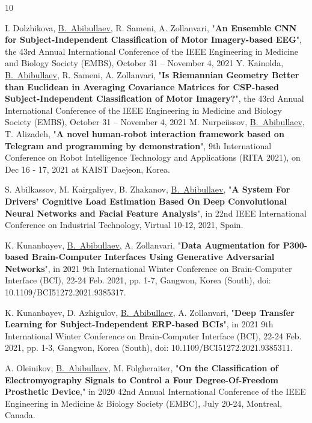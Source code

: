 \documentclass[10pt,letterpaper,sans]{moderncv}   %
\begin{document}
    
\renewcommand{\refname}{Conference proceedings}
\begin{thebibliography}{10}

\small
I. Dolzhikova, \underline{B.~Abibullaev}, R. Sameni, A. Zollanvari, "\textbf{An Ensemble CNN for Subject-Independent Classification of Motor Imagery-based EEG}", the 43rd Annual International Conference of the IEEE Engineering in Medicine and Biology Society (EMBS), October 31 – November 4, 2021
\small
Y. Kainolda, \underline{B.~Abibullaev}, R. Sameni, A. Zollanvari, "\textbf{Is Riemannian Geometry Better than Euclidean in Averaging Covariance Matrices for CSP-based Subject-Independent Classification of Motor Imagery?}", the 43rd Annual International Conference of the IEEE Engineering in Medicine and Biology Society (EMBS), October 31 – November 4, 2021
\small
M. Nurpeiissov, \underline{B.~Abibullaev}, T. Alizadeh,  "\textbf{A novel human-robot interaction framework based on Telegram and programming by demonstration}", 9th International Conference on Robot Intelligence Technology and Applications (RITA 2021), on Dec 16 - 17, 2021 at KAIST Daejeon, Korea.
    
\small
S. Abilkassov, M. Kairgaliyev, B. Zhakanov, \underline{B.~Abibullaev}, 
"\textbf{A System For Drivers' Cognitive Load Estimation Based On Deep Convolutional Neural Networks and Facial Feature Analysis}", in 22nd IEEE International Conference on Industrial Technology, Virtual 10-12, 2021, Spain.

\small
K. Kunanbayev, \underline{B.~Abibullaev}, A. Zollanvari, "\textbf{Data Augmentation for P300-based Brain-Computer Interfaces Using Generative Adversarial Networks}", in 2021 9th International Winter Conference on Brain-Computer Interface (BCI), 22-24 Feb. 2021, pp. 1-7, Gangwon, Korea (South), doi: 10.1109/BCI51272.2021.9385317.

\small
K. Kunanbayev, D. Azhigulov,  \underline{B.~Abibullaev}, A. Zollanvari, "\textbf{Deep Transfer Learning for Subject-Independent ERP-based BCIs}", in 2021 9th International Winter Conference on Brain-Computer Interface (BCI), 22-24 Feb. 2021, pp. 1-3,  Gangwon, Korea (South), doi: 10.1109/BCI51272.2021.9385311.

\small
A. Oleinikov, \underline{B.~Abibullaev}, M. Folgheraiter, "\textbf{On the Classification of 
Electromyography Signals to Control a Four Degree-Of-Freedom Prosthetic Device},"
in 2020 42nd Annual International Conference of the IEEE Engineering in Medicine \& 
Biology Society (EMBC), July 20-24, Montreal, Canada. 


\end{thebibliography}
\end{document}
